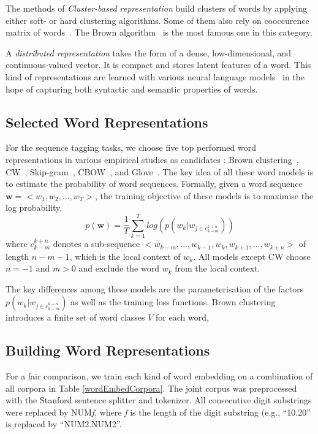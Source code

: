The methods of \textit{Cluster-based representation} build clusters of words by applying either soft- or hard clustering algorithms. Some of them also rely on cooccurence matrix of words~\cite{}. The Brown algorithm~\cite{} is the most famous one in this category.

A \textit{distributed representation} takes the form of a dense, low-dimensional, and continuous-valued vector. It is compact and stores latent features of a word. This kind of representations are learned with various neural language models~\cite{} in the hope of capturing both syntactic and semantic properties of words.

\subsection{Selected Word Representations}
For the sequence tagging tasks, we choose five top performed word representations in various empirical studies as candidates : Brown clustering~\cite{}, CW~\cite{}, Skip-gram~\cite{}, CBOW~\cite{}, and Glove~\cite{}. The key idea of all these word models is to estimate the probability of word sequences. Formally, given a word sequence $\mathbf{w}=<w_1, w_2, ..., w_T>$, the training objective of these models is to maximise the log probability.
\begin{equation}
p(\mathbf{w}) = \frac{1}{T}\sum_{k = 1}^T log(p(w_k | w_{j \in c_{k - m}^{k + n}}))
\end{equation}
where $c_{k - m}^{k + n}$ denotes a sub-sequence $<w_{k-m}, ..., w_{k - 1}, w_k, w_{k + 1}, ..., w_{k+n}>$ of length $n - m - 1$, which is the local context of $w_k$. All models except CW choose $n = -1$ and $m > 0$ and exclude the word $w_k$ from the local context.

The key differences among these models are the parameterisation of the factors $p(w_k | w_{j \in c_{k - m}^{k + n}})$ as well as the training loss functions. Brown clustering introduces a finite set of word classes $V$ for each word,  

\subsection{Building Word Representations}
For a fair comparison, we train each kind of word embedding on a combination of all corpora in Table \ref{wordEmbedCorpora}. The joint corpus was preprocessed with the Stanford sentence splitter and tokenizer. All consecutive digit substrings were replaced by NUM\textit{f}, where \textit{f} is the length of the digit substring (e.g., ``10.20'' is replaced by ``NUM2.NUM2''.

